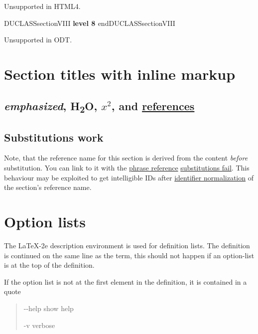 \documentclass[a4paper]{article}
\newenvironment{DUclass}[1]%
    {%
     \def\DocutilsClassFunctionName{DUCLASS#1}
     \csname \DocutilsClassFunctionName \endcsname}%
    {\csname end\DocutilsClassFunctionName \endcsname}%
\providecommand*{\DUoptionlistlabel}[1]{\bfseries #1 \hfill}
\newenvironment{DUoptionlist}{%
    \list{}{\setlength{\labelwidth}{\DUoptionlistindent}
            \setlength{\rightmargin}{1cm}
            \setlength{\leftmargin}{\rightmargin}
            \addtolength{\leftmargin}{\labelwidth}
            \addtolength{\leftmargin}{\labelsep}
            \renewcommand{\makelabel}{\DUoptionlistlabel}}
  }
  {\endlist}
\providecommand*{\DUtitle}[1]{%
  \smallskip\noindent\textbf{#1}\smallskip}
\begin{document}
Unsupported in HTML4.


\begin{DUclass}{sectionVIII}
\DUtitle{level 8%
  \label{level-8}%
}
\end{DUclass}

Unsupported in ODT.


\section{Section titles with inline markup%
  \label{section-titles-with-inline-markup}%
  \label{references}%
}


\subsection{\emph{emphasized}, H\textsubscript{2}O, $x^2$, and \hyperref[references]{references}%
  \label{emphasized-h2o-x-2-and-references}%
}


\subsection{Substitutions work%
  \label{substitutions-fail}%
}

Note, that the \textquotedbl{}reference name\textquotedbl{} for this section is derived from the
content \emph{before} substitution. You can link to it with the \href{https://docutils.sourceforge.io/docs/ref/rst/restructuredtext.html\#hyperlink-references}{phrase
reference} \textquotedbl{}\hyperref[substitutions-fail]{substitutions fail}\textquotedbl{}.
This behaviour may be exploited to get intelligible IDs after \href{https://docutils.sourceforge.io/docs/ref/rst/directives.html\#identifier-normalization}{identifier
normalization} of the section's reference name.



\section{Option lists%
  \label{option-lists}%
}

The LaTeX-2e description environment is used for definition lists.
The definition is continued on the same line as the term, this should
not happen if an option-list is at the top of the definition.

If the option list is not at the first element in the definition, it
is contained in a quote

\begin{quote}
\begin{DUoptionlist}
\item[-{}-help]  show help
\item[-v]  verbose
\end{DUoptionlist}
\end{quote}
\end{document}
